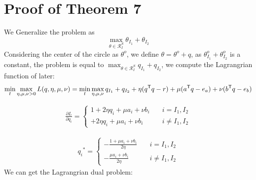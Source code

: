 \section{Proof of Theorem 7}
We Generalize the problem as 
\begin{equation}
\max_{\theta \in \mathcal{R}^{S}_{I}}{ \theta_{I_1} +\theta_{I_2} }
\end{equation}
Considering the center of the circle as $\theta^o$, we define $\theta = \theta^{o} + q$, as ${ \theta^{o}_{I_1} +\theta^{o}_{I_2} }$ is a constant, the problem is equal to  $\max_{\theta \in \mathcal{R}^{S}_{I}}{ q_{I_1} +q_{I_2} }$, we compute the Lagrangrian function of later:
\begin{equation}
\min_{t} \max_{\eta,\mu,\nu > 0}  L(q,\eta,\mu,\nu) =\min_{t}\max_{\eta,\mu,\nu}   {q_{I_1} +q_{I_2}  + \eta( q^{\mathsf T}q - r)+\mu( a^{\mathsf T}q - e_a ) + \nu( b^{\mathsf T}q - e_b )}
\end{equation}

 \begin{equation}
\begin{split} 
\frac{\partial L}{\partial q_i} =  \left\{
\begin{aligned}
1 + 2\eta q_i +\mu a_i + \nu b_i \quad&  i = I_1, I_2\\
 + 2\eta q_i +\mu a_i + \nu b_i \quad&  i \neq I_1, I_2
\end{aligned}
\right.
 \end{split}
\label{eq:lang1}
\end{equation}

 \begin{equation}
\begin{split} 
{q_i}^{*} =  \left\{
\begin{aligned}
-\frac{1+\mu a_i + \nu b_i}{2\eta} \quad&  i = I_1, I_2\\
-\frac{\mu a_i + \nu b_i}{2\eta} \quad&  i \neq I_1, I_2
\end{aligned}
\right.
 \end{split}
\label{eq:lang1}
\end{equation}
We can get the Lagrangrian dual problem:

